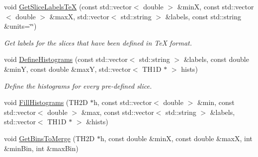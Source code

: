 \begin{DoxyCompactItemize}
void \hyperlink{namespacecalib_abd137fd17c09e5cd7f72cce6747df25d}{Get\-Slice\-Labels\-Te\-X} (const std\-::vector$<$ double $>$ \&min\-X, const std\-::vector$<$ double $>$ \&max\-X, std\-::vector$<$ std\-::string $>$ \&labels, const std\-::string \&units=\char`\"{}\char`\"{})
\begin{DoxyCompactList}\small\item\em Get labels for the slices that have been defined in Te\-X format. \end{DoxyCompactList}\item 
void \hyperlink{namespacecalib_a0c91c7c7722a9fb26ab6c875525abb28}{Define\-Histograms} (const std\-::vector$<$ std\-::string $>$ \&labels, const double \&min\-Y, const double \&max\-Y, std\-::vector$<$ T\-H1\-D $\ast$ $>$ hists)
\begin{DoxyCompactList}\small\item\em Define the histograms for every pre-\/defined slice. \end{DoxyCompactList}\item 
void \hyperlink{namespacecalib_aa22908bcf9b16a83f1208d56eeded460}{Fill\-Histograms} (T\-H2\-D $\ast$h, const std\-::vector$<$ double $>$ \&min, const std\-::vector$<$ double $>$ \&max, const std\-::vector$<$ std\-::string $>$ \&labels, std\-::vector$<$ T\-H1\-D $\ast$ $>$ \&hists)
\item 
void \hyperlink{namespacecalib_a32e9a8dfc31d0d22703fda42cf1b2757}{Get\-Bins\-To\-Merge} (T\-H2\-D $\ast$h, const double \&min\-X, const double \&max\-X, int \&min\-Bin, int \&max\-Bin)
\end{DoxyCompactItemize}
